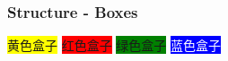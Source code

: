 \documentclass[aspectratio=169,utf8]{beamer}
\begin{document}
%
%
%
%
%
%
%
%
%
%


\begin{frame}
  \frametitle{Structure - Boxes}

  \centering
  \colorbox{yellow}{黄色盒子}
  \quad
  \colorbox{red}{红色盒子}
  \quad
  \colorbox{green}{绿色盒子}
  \quad
  \colorbox{blue}{\textcolor{white}{蓝色盒子}}
\end{frame}
\end{document}
